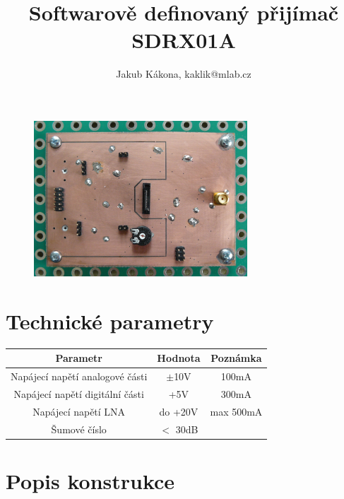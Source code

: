 \documentclass[12pt,a4paper,oneside]{article}
\begin{document}
\title{Softwarově definovaný přijímač SDRX01A}
\author{Jakub Kákona, kaklik@mlab.cz}
\maketitle

\begin{abstract}
\end{abstract}

\begin{figure} [htbp]
\begin{center}
\includegraphics [width=80mm] {SDRX01A_Top_Big.JPG} 
\end{center}
\end{figure}

\tableofcontents

\section{Technické parametry}
\begin{table}[htbp]
\begin{center}
\begin{tabular}{|c|c|c|}
\hline
\multicolumn{1}{|c|}{Parametr} & \multicolumn{1}{|c|}{Hodnota} & \multicolumn{1}{|c|}{Poznámka} \\ \hline
Napájecí napětí analogové části & $\pm$10V &  100mA \\ \hline
Napájecí napětí digitální části & +5V &  300mA \\ \hline
Napájecí napětí LNA & do +20V &  max 500mA \\ \hline
Šumové číslo  & $<$ 30dB & \\ \hline
\end{tabular}
\end{center}
\end{table}

\newpage
\section{Popis konstrukce}
\end{document}
